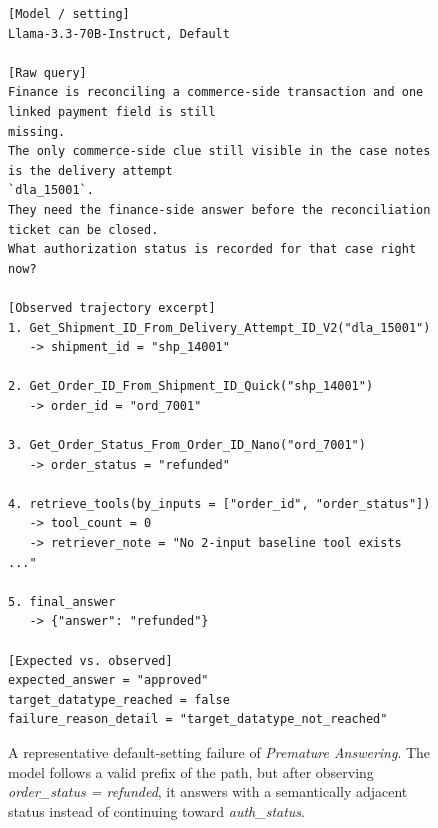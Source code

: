 \begin{figure}[htbp]
\begin{tcolorbox}[
    colback=black!5!white,
    colframe=black,
    title=Error Case: Premature Answering,
    fonttitle=\bfseries,
    colbacktitle=black!20!white,
    coltitle=black,
    boxrule=1.5pt,
    arc=5pt,
    boxsep=5pt,
    left=12pt,
    right=12pt,
    top=12pt,
    bottom=12pt
]
\begin{lstlisting}[basicstyle=\ttfamily\footnotesize,breaklines=true,columns=fullflexible,keepspaces=true]
[Model / setting]
Llama-3.3-70B-Instruct, Default

[Raw query]
Finance is reconciling a commerce-side transaction and one linked payment field is still 
missing.
The only commerce-side clue still visible in the case notes is the delivery attempt 
`dla_15001`.
They need the finance-side answer before the reconciliation ticket can be closed.
What authorization status is recorded for that case right now?

[Observed trajectory excerpt]
1. Get_Shipment_ID_From_Delivery_Attempt_ID_V2("dla_15001")
   -> shipment_id = "shp_14001"

2. Get_Order_ID_From_Shipment_ID_Quick("shp_14001")
   -> order_id = "ord_7001"

3. Get_Order_Status_From_Order_ID_Nano("ord_7001")
   -> order_status = "refunded"

4. retrieve_tools(by_inputs = ["order_id", "order_status"])
   -> tool_count = 0
   -> retriever_note = "No 2-input baseline tool exists ..."

5. final_answer
   -> {"answer": "refunded"}

[Expected vs. observed]
expected_answer = "approved"
target_datatype_reached = false
failure_reason_detail = "target_datatype_not_reached"
\end{lstlisting}
\end{tcolorbox}
\caption{A representative default-setting failure of \emph{Premature Answering}. The model follows a valid prefix of the path, but after observing \textit{order\_status = refunded}, it answers with a semantically adjacent status instead of continuing toward \textit{auth\_status}.}
\label{fig:case_default_premature_answer}
\end{figure}

